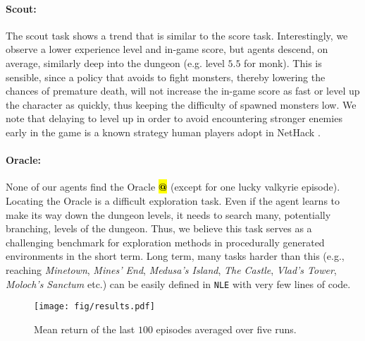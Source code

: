 \documentclass{article}
\makeatletter
\newcommand{\nethack}{NetHack}
\newcommand{\NLE}{\texttt{NLE}}
\newcommand{\Oracle}{{\bf\ttfamily\color{nethack_light_blue}\sethlcolor{black}\hl{@}}}
\makeatother
\begin{document}
\paragraph{Scout:}
The scout task shows a trend that is similar to the score task.
Interestingly, we observe a lower experience level and in-game score, but agents descend, on average,
similarly deep into the dungeon (e.g. level $5.5$ for monk).
This is sensible, since a policy that avoids to
fight monsters, thereby lowering the chances of premature death, will not
increase the in-game score as fast or level up the character as quickly, thus keeping the difficulty of spawned monsters low.
We note that delaying to level up in order to avoid
encountering stronger enemies early in the game is a known strategy human
players adopt in \nethack{} \citep[e.g.][``Why do I keep dying?''
entry, January 2019 version]{nhwiki}.

\paragraph{Oracle:}
None of our agents find the Oracle \Oracle{} (except for one lucky valkyrie episode). Locating the Oracle is a difficult exploration task.
Even if the agent learns to make its way down the dungeon levels, it needs to search many, potentially branching, levels of the dungeon.
Thus, we believe this task serves as a challenging benchmark for exploration methods in procedurally generated environments in the short term.
Long term, many tasks harder than this (e.g.,
reaching \emph{Minetown}, \emph{Mines' End}, \emph{Medusa's Island}, \emph{The Castle}, \emph{Vlad's Tower}, \emph{Moloch's Sanctum} etc.) can be easily defined in \NLE{} with very few lines of code.


\begin{figure*}[t!]
    \centering \texttt{[image: fig/results.pdf]}
    \caption{Mean return of the last $100$ episodes averaged
      over five runs.}
    \label{fig:results}
\end{figure*}
\end{document}
